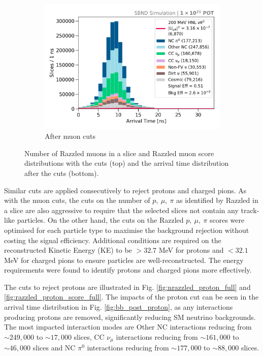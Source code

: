 \begin{figure}[hb!]
\begin{subfigure}[b]{0.495\textwidth}
            \centering 
            \includegraphics[width=\textwidth]{beam_bucket_postmuon}
            \caption{After muon cuts}%
            \label{fig:bb_post_muon}
        \end{subfigure}
	\caption[Muon Cuts]{
		Number of Razzled muons in a slice and Razzled muon score distributions with the cuts (top) and the arrival time distribution after the cuts (bottom). 
	}
        \label{fig:razzled_muon_cut}
\end{figure}

Similar cuts are applied consecutively to reject protons and charged pions.
As with the muon cuts, the cuts on the number of $p,\ \mu,\ \pi$ as identified by Razzled in a slice are also aggressive to require that the selected slices not contain any track-like particles.
On the other hand, the cuts on the Razzled $p,\ \mu,\ \pi$ scores were optimised for each particle type to maximise the background rejection without costing the signal efficiency.
Additional conditions are required on the reconstructed Kinetic Energy (KE) to be $ > 32.7$ MeV for protons and $< 32.1$ MeV for charged pions to ensure particles are well-reconstructed. 
The energy requirements were found to identify protons and charged pions more effectively.

The cuts to reject protons are illustrated in Fig. \ref{fig:nrazzled_proton_full} and \ref{fig:razzled_proton_score_full}.
The impacts of the proton cut can be seen in the arrival time distribution in Fig. \ref{fig:bb_post_proton}, as any interactions producing protons are removed, significantly reducing SM neutrino backgrounds.
The most impacted interaction modes are Other NC interactions reducing from $\sim249,000$ to $\sim17,000$ slices, CC $\nu_\mu$ interactions reducing from $\sim161,000$ to $\sim46,000$ slices and NC $\pi^0$ interactions reducing from $\sim 177,000$ to $\sim88,000$ slices.

